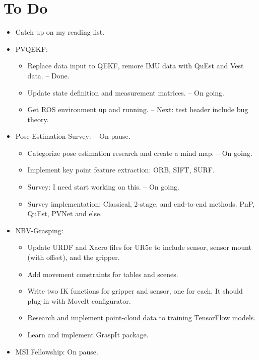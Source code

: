 \documentclass[11pt]{article}
\begin{document}
\section{To Do}
\begin{itemize}
  \item Catch up on my reading list.
  \item PVQEKF:
  \begin{itemize}
      \item Replace data input to QEKF, remore IMU data with QuEst and Vest data. -- Done.
      \item Update state definition and measurement matrices. -- On going.
      \item Get ROS environment up and running. -- Next: test header include bug theory.
  \end{itemize}
  \item Pose Estimation Survey: -- On pause.
  \begin{itemize}
      \item Categorize pose estimation research and create a mind map. -- On going.
      \item Implement key point feature extraction: ORB, SIFT, SURF.
      \item Survey: I need start working on this. -- On going.
      \item Survey implementation: Classical, 2-stage, and end-to-end methods. PnP, QuEst, PVNet and else.
  \end{itemize}
  \item NBV-Grasping:
      \begin{itemize}
      \item Update URDF and Xacro files for UR5e to include sensor, sensor mount (with offset), and the gripper.
      \item Add movement constraints for tables and scenes.
      \item Write two IK functions for gripper and sensor, one for each. It should plug-in with MoveIt configurator.
      \item Research and implement point-cloud data to training TensorFlow models.
      \item Learn and implement GraspIt package.
      \end{itemize}
  \item MSI Fellowship: On pause.
\end{itemize}
\end{document}
